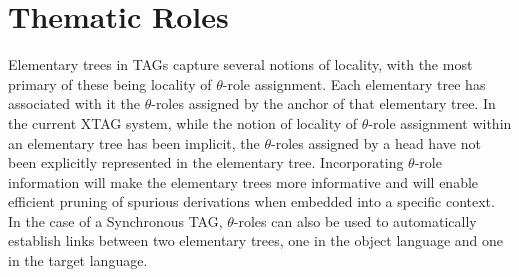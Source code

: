  
\section{Thematic Roles} 
 
Elementary trees in TAGs capture several notions of locality, with the most 
primary of these being locality of $\theta$-role assignment.  Each elementary 
tree has associated with it the $\theta$-roles assigned by the anchor of that 
elementary tree.  In the current XTAG system, while the notion of locality of 
$\theta$-role assignment within an elementary tree has been implicit, the 
$\theta$-roles assigned by a head have not been explicitly represented in the 
elementary tree. Incorporating $\theta$-role information will make the 
elementary trees more informative and will enable efficient pruning of spurious 
derivations when embedded into a specific context.  In the case of a 
Synchronous TAG, $\theta$-roles can also be used to automatically establish 
links between two elementary trees, one in the object language and one in the 
target language. 
 
 
 
 
 
 
 
 
 
 
 
 
 
 
 
 
 
 
 
 
 
